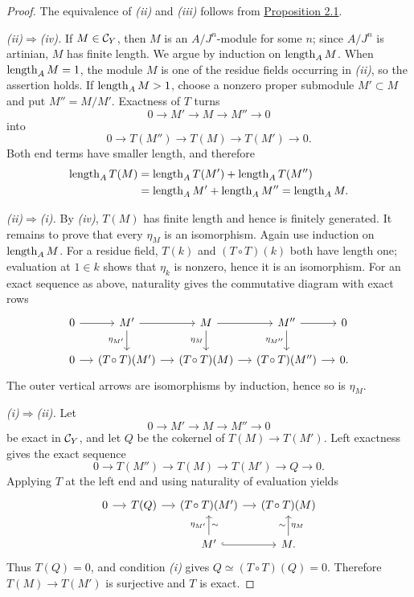 \begin{proof}
The equivalence of \emph{(ii)} and \emph{(iii)} follows from
\hyperref[IV.2.1]{Proposition 2.1}.

\smallskip\noindent
\emph{(ii)$\Rightarrow$(iv).}
If $M\in\mathcal C_Y$, then $M$ is an $A/J^n$-module for some $n$; since
$A/J^n$ is artinian, $M$ has finite length. We argue by induction on
$\operatorname{length}_A M$. When $\operatorname{length}_A M=1$, the module $M$ is one of the residue fields
occurring in \emph{(ii)}, so the assertion holds. If $\operatorname{length}_A M>1$, choose
a nonzero proper submodule $M'\subset M$ and put $M''=M/M'$. Exactness
of $T$ turns
\[
  0\longrightarrow M'\longrightarrow M\longrightarrow M''\longrightarrow0
\]
into
\[
  0\longrightarrow T(M'')\longrightarrow T(M)
   \longrightarrow T(M')\longrightarrow0.
\]
Both end terms have smaller length, and therefore
\[
\begin{aligned}
  \operatorname{length}_A T(M)
    &=\operatorname{length}_A T(M')+\operatorname{length}_A T(M'')\\
    &=\operatorname{length}_A M'+\operatorname{length}_A M''=\operatorname{length}_A M.
\end{aligned}
\]

\smallskip\noindent
\emph{(ii)$\Rightarrow$(i).}
By \emph{(iv)}, $T(M)$ has finite length and hence is finitely generated.
It remains to prove that every $\eta_M$ is an isomorphism. Again use
induction on $\operatorname{length}_A M$. For a residue field, $T(k)$ and $(T\circ T)(k)$
both have length one; evaluation at $1\in k$ shows that $\eta_k$ is
nonzero, hence it is an isomorphism. For an exact sequence as above,
naturality gives the
commutative diagram with exact rows
\[
\begin{tikzcd}[column sep=small]
0 \arrow[r] & M' \arrow[r] \arrow[d,"\eta_{M'}"']
  & M \arrow[r] \arrow[d,"\eta_M"']
  & M'' \arrow[r] \arrow[d,"\eta_{M''}"'] & 0\\
0 \arrow[r] & (T\!\circ T)(M') \arrow[r]
  & (T\!\circ T)(M) \arrow[r]
  & (T\!\circ T)(M'') \arrow[r] & 0.
\end{tikzcd}
\]
The outer vertical arrows are isomorphisms by induction, hence so is
$\eta_M$.

\smallskip\noindent
\emph{(i)$\Rightarrow$(ii).}
Let
\[
  0\longrightarrow M'\longrightarrow M\longrightarrow M''\longrightarrow0
\]
be exact in $\mathcal C_Y$, and let $Q$ be the cokernel of
$T(M)\to T(M')$. Left exactness gives the exact sequence
\[
  0\longrightarrow T(M'')\longrightarrow T(M)
   \longrightarrow T(M')\longrightarrow Q\longrightarrow0.
\]
Applying $T$ at the left end and using naturality of evaluation yields
\[
\begin{tikzcd}[column sep=small]
0 \arrow[r] & T(Q) \arrow[r] & (T\!\circ T)(M') \arrow[r]
  & (T\!\circ T)(M)\\
&& M' \arrow[u,"\eta_{M'}","\sim"'] \arrow[r,hook]
  & M \arrow[u,"\eta_M"',"\sim"] .
\end{tikzcd}
\]
Thus $T(Q)=0$, and condition \emph{(i)} gives
$Q\simeq(T\circ T)(Q)=0$. Therefore $T(M)\to T(M')$ is surjective and
$T$ is exact.


\end{proof}
